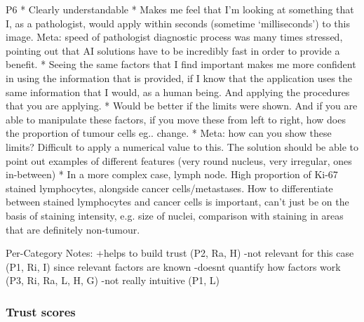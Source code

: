 P6
* Clearly understandable
* Makes me feel that I’m looking at something that I, as a pathologist, would apply within seconds (sometime ‘milliseconds’)   to this image. Meta: speed of pathologist diagnostic process was many times stressed, pointing out that AI solutions have to be incredibly fast in order to provide a benefit.
* Seeing the same factors that I find important makes me more confident in using the information that is provided, if I know that the application uses the same information that I would, as a human being. And applying the procedures that you are applying.
* Would be better if the limits were shown. And if you are able to manipulate these factors, if you move these from left to right, how does the proportion of tumour cells eg.. change. 
* Meta: how can you show these limits? Difficult to apply a numerical value to this. The solution should be able to point out examples of different features (very round nucleus, very irregular, ones in-between)
* In a more complex case, lymph node. High proportion of Ki-67 stained lymphocytes, alongside cancer cells/metastases. How to differentiate between stained lymphocytes and cancer cells is important, can’t just be on the basis of staining intensity, e.g. size of nuclei, comparison with staining in areas that are definitely non-tumour.

Per-Category Notes:
+helps to build trust (P2, Ra, H)
-not relevant for this case (P1, Ri, I) since relevant factors are known
-doesnt quantify how factors work (P3, Ri, Ra, L, H, G)
-not really intuitive (P1, L)

\subsubsection{Trust scores}



